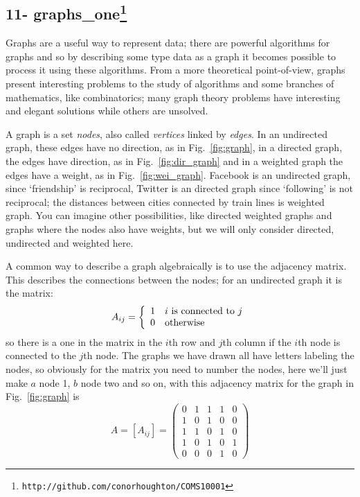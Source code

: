 \documentclass[11pt,a4paper]{scrartcl}
\begin{document}
\subsection*{11- graphs\_one\footnote{\texttt{http://github.com/conorhoughton/COMS10001}}}

Graphs are a useful way to represent data; there are powerful
algorithms for graphs and so by describing some type data as a graph
it becomes possible to process it using these algorithms. From a more
theoretical point-of-view, graphs present interesting problems to the
study of algorithms and some branches of mathematics, like
combinatorics; many graph theory problems have interesting and elegant
solutions while others are unsolved.

A graph is a set \textsl{nodes}, also called \textsl{vertices} linked
by \textsl{edges}. In an undirected graph, these edges have no
direction, as in Fig.~\ref{fig:graph}, in a directed graph, the edges
have direction, as in Fig.~\ref{fig:dir_graph} and in a weighted graph
the edges have a weight, as in Fig.~\ref{fig:wei_graph}. Facebook is
an undirected graph, since \lq{}friendship\rq{} is reciprocal, Twitter
is an directed graph since \lq{}following\rq{} is not reciprocal; the
distances between cities connected by train lines is weighted
graph. You can imagine other possibilities, like directed weighted
graphs and graphs where the nodes also have weights, but we will only
consider directed, undirected and weighted here.

A common way to describe a graph algebraically is to use the adjacency
matrix. This describes the connections between the nodes; for an undirected graph it is the matrix:
\begin{equation}
A_{ij}=\left\{\begin{array}{cl}1&i\mbox{ is connected to }j\cr0&\mbox{otherwise}
\end{array}\right.
\end{equation}
so there is a one in the matrix in the $i$th row and $j$th column if
the $i$th node is connected to the $j$th node. The graphs we have
drawn all have letters labeling the nodes, so obviously for the matrix
you need to number the nodes, here we'll just make $a$ node 1, $b$ node two and so on, with this adjacency matrix for the graph in Fig.~\ref{fig:graph} is
\begin{equation}
A=[A_{ij}]=\left(
\begin{array}{ccccc}
0&1&1&1&0\\
1&0&1&0&0\\
1&1&0&1&0\\
1&0&1&0&1\\
0&0&0&1&0
\end{array}
\right)
\end{equation}
\end{document}
